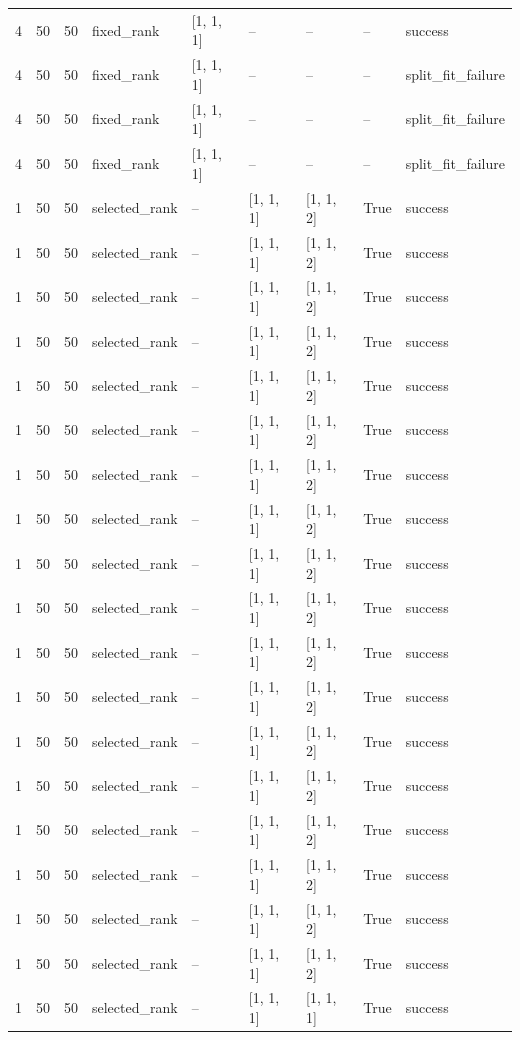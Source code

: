 \begin{longtable}{lllllllll}
4 & 50 & 50 & fixed\_rank & [1, 1, 1] & -- & -- & -- & success \\
4 & 50 & 50 & fixed\_rank & [1, 1, 1] & -- & -- & -- & split\_fit\_failure \\
4 & 50 & 50 & fixed\_rank & [1, 1, 1] & -- & -- & -- & split\_fit\_failure \\
4 & 50 & 50 & fixed\_rank & [1, 1, 1] & -- & -- & -- & split\_fit\_failure \\
1 & 50 & 50 & selected\_rank & -- & [1, 1, 1] & [1, 1, 2] & True & success \\
1 & 50 & 50 & selected\_rank & -- & [1, 1, 1] & [1, 1, 2] & True & success \\
1 & 50 & 50 & selected\_rank & -- & [1, 1, 1] & [1, 1, 2] & True & success \\
1 & 50 & 50 & selected\_rank & -- & [1, 1, 1] & [1, 1, 2] & True & success \\
1 & 50 & 50 & selected\_rank & -- & [1, 1, 1] & [1, 1, 2] & True & success \\
1 & 50 & 50 & selected\_rank & -- & [1, 1, 1] & [1, 1, 2] & True & success \\
1 & 50 & 50 & selected\_rank & -- & [1, 1, 1] & [1, 1, 2] & True & success \\
1 & 50 & 50 & selected\_rank & -- & [1, 1, 1] & [1, 1, 2] & True & success \\
1 & 50 & 50 & selected\_rank & -- & [1, 1, 1] & [1, 1, 2] & True & success \\
1 & 50 & 50 & selected\_rank & -- & [1, 1, 1] & [1, 1, 2] & True & success \\
1 & 50 & 50 & selected\_rank & -- & [1, 1, 1] & [1, 1, 2] & True & success \\
1 & 50 & 50 & selected\_rank & -- & [1, 1, 1] & [1, 1, 2] & True & success \\
1 & 50 & 50 & selected\_rank & -- & [1, 1, 1] & [1, 1, 2] & True & success \\
1 & 50 & 50 & selected\_rank & -- & [1, 1, 1] & [1, 1, 2] & True & success \\
1 & 50 & 50 & selected\_rank & -- & [1, 1, 1] & [1, 1, 2] & True & success \\
1 & 50 & 50 & selected\_rank & -- & [1, 1, 1] & [1, 1, 2] & True & success \\
1 & 50 & 50 & selected\_rank & -- & [1, 1, 1] & [1, 1, 2] & True & success \\
1 & 50 & 50 & selected\_rank & -- & [1, 1, 1] & [1, 1, 2] & True & success \\
1 & 50 & 50 & selected\_rank & -- & [1, 1, 1] & [1, 1, 1] & True & success \\

\end{longtable}
